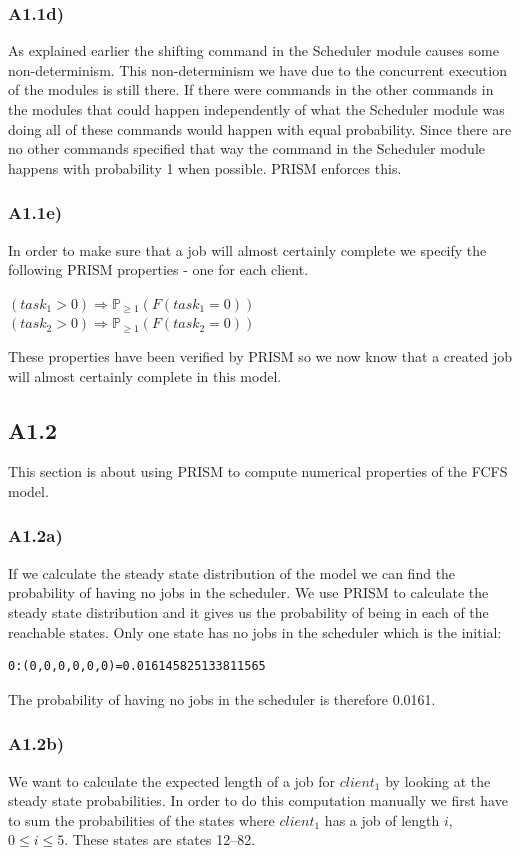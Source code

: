 \documentclass[12pt]{report}
\begin{document}
\subsubsection*{A1.1d)}
As explained earlier the shifting command in the Scheduler module causes some non-determinism. This non-determinism we have due to the concurrent execution of the modules is still there. If there were commands in the other commands in the modules that could happen independently of what the Scheduler module was doing all of these commands would happen with equal probability. Since there are no other commands specified that way the command in the Scheduler module happens with probability 1 when possible. PRISM enforces this.

\subsubsection*{A1.1e)}
In order to make sure that a job will almost certainly complete we specify the following PRISM properties - one for each client.
\begin{center}
$(task_1 > 0) \Rightarrow \mathbb{P}_{\geq 1}(F(task_1 = 0))$\\
$(task_2 > 0) \Rightarrow \mathbb{P}_{\geq 1}(F(task_2 = 0))$
\end{center}
These properties have been verified by PRISM so we now know that a created job will almost certainly complete in this model.

\subsection*{A1.2}
This section is about using PRISM to compute numerical properties of the FCFS model.

\subsubsection*{A1.2a)}
If we calculate the steady state distribution of the model we can find the probability of having no jobs in the scheduler. We use PRISM to calculate the steady state distribution and it gives us the probability of being in each of the reachable states. Only one state has no jobs in the scheduler which is the initial:
\begin{lstlisting}[style=logoutput]
0:(0,0,0,0,0,0)=0.016145825133811565
\end{lstlisting}
The probability of having no jobs in the scheduler is therefore 0.0161.

\subsubsection*{A1.2b)}
We want to calculate the expected length of a job for $client_1$ by looking at the steady state probabilities. In order to do this computation manually we first have to sum the probabilities of the states where $client_1$ has a job of length $i$, $0 \leq i \leq 5$. These states are states 12--82.
\end{document}
